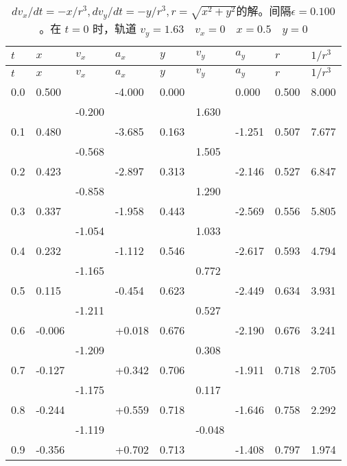 \documentclass[12pt,oneside]{book}
\begin{document}
{
\renewcommand{\arraystretch}{0.8}  
\small
\begin{longtable}{@{}lllllllll@{}}
\caption{$dv_x/dt=-x/r^3, dv_y/dt=-y/r^3, r=\sqrt{x^2+y^2} $的解。间隔$ \epsilon = 0.100 $ 。在 $ t=0 $ 时，轨道 $ v_y=1.63 \quad v_x=0 \quad x=0.5 \quad y=0 $}
\label{tab:表9-2} \\

\toprule
$ t $  & $ x $ & $ v_x $ & $ a_x $ & $ y $ & $ v_y $ & $ a_y $ & $ r $ & $ 1/r^3 $ \\ \midrule
\endfirsthead

\toprule
$ t $  & $ x $ & $ v_x $ & $ a_x $ & $ y $ & $ v_y $ & $ a_y $ & $ r $ & $ 1/r^3 $ \\ \midrule
\endhead

0.0 & 0.500 &   & -4.000 & 0.000 &   & 0.000 & 0.500 & 8.000 \\
    &   & -0.200 &   &   & 1.630 &   &   &   \\
0.1   & 0.480 &   & -3.685 & 0.163 &   & -1.251 & 0.507 & 7.677 \\
    &   & -0.568 &   &   & 1.505 &   &   &   \\
0.2   & 0.423 &   & -2.897 & 0.313 &   & -2.146 & 0.527 & 6.847 \\
    &   & -0.858 &   &   & 1.290 &   &   &   \\
0.3   & 0.337 &   & -1.958 & 0.443 &   & -2.569 & 0.556 & 5.805 \\
    &   & -1.054 &   &   & 1.033 &   &   &   \\
0.4   & 0.232 &   & -1.112 & 0.546 &   & -2.617 & 0.593 & 4.794 \\
    &   & -1.165 &   &   & 0.772 &   &   &   \\
0.5   & 0.115 &   & -0.454 & 0.623 &   & -2.449 & 0.634 & 3.931 \\
    &   & -1.211 &   &   & 0.527 &   &   &   \\
0.6   & -0.006 &   & +0.018 & 0.676 &   & -2.190 & 0.676 & 3.241 \\
    &   & -1.209 &   &   & 0.308 &   &   &   \\
0.7   & -0.127 &   & +0.342 & 0.706 &   & -1.911 & 0.718 & 2.705 \\
    &   & -1.175 &   &   & 0.117 &   &   &   \\
0.8   & -0.244 &   & +0.559 & 0.718 &   & -1.646 & 0.758 & 2.292 \\
    &   & -1.119 &   &   & -0.048 &   &   &   \\
0.9   & -0.356 &   & +0.702 & 0.713 &   & -1.408 & 0.797 & 1.974 \\

\end{longtable}}
\end{document}
